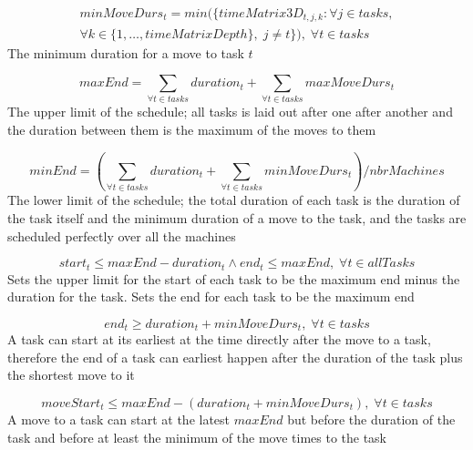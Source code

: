\documentclass[10pt,a4paper]{report}
\begin{document}
\begin{equation}
\begin{aligned}\label{eq:58}
minMoveDurs_t = min(\{timeMatrix3D_{t,j,k} : \forall j \in tasks, \\
 \forall k \in \{1 , \ldots , timeMatrixDepth\}, \; j \neq t\}), \; \forall t \in tasks
\end{aligned}
\end{equation}
The minimum duration for a move to task $t$

\begin{equation}\label{eq:59}
maxEnd = \sum_{\forall t \in tasks} duration_t + \sum_{\forall t \in tasks} maxMoveDurs_t\end{equation}
The upper limit of the schedule; all tasks is laid out after one after another and the duration between them is the maximum of the moves to them

\begin{equation}\label{eq:60}
minEnd = \left(\sum_{\forall t \in tasks} duration_t + \sum_{\forall t \in tasks} minMoveDurs_t\right) / nbrMachines
\end{equation}
The lower limit of the schedule; the total duration of each task is the duration of the task itself and the minimum duration of a move to the task, and the tasks are scheduled perfectly over all the machines

\begin{equation}\label{eq:61}
start_t \le maxEnd-duration_t \land end_t \le maxEnd, \; \forall t \in allTasks\end{equation}
Sets the upper limit for the start of each task to be the maximum end minus the duration for the task. Sets the end for each task to be the maximum end

\begin{equation}\label{eq:62}
end_t \ge duration_t + minMoveDurs_t, \; \forall t \in tasks\end{equation}
A task can start at its earliest at the time directly after the move to a task, therefore the end of a task can earliest happen after the duration of the task plus the shortest move to it

\begin{equation}\label{eq:63}
moveStart_t \le maxEnd-(duration_t+minMoveDurs_t), \; \forall t \in tasks\end{equation}
A move to a task can start at the latest $maxEnd$ but before the duration of the task and before at least the minimum of the move times to the task
\end{document}

